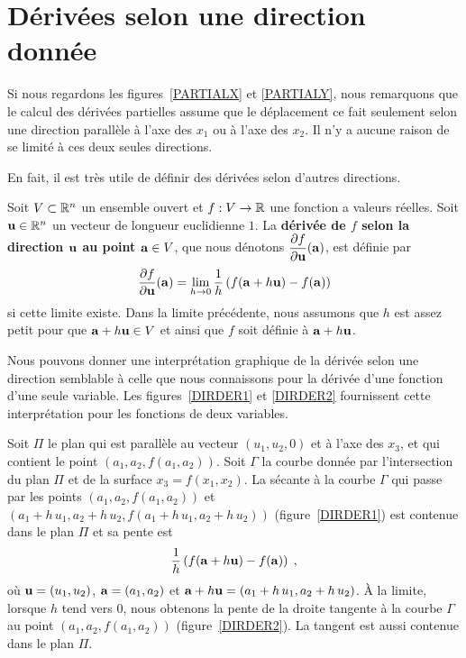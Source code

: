 {\section{Dérivées selon une direction donnée \eng}

Si nous regardons les figures~\ref{PARTIALX} et \ref{PARTIALY}, nous
remarquons que le calcul des dérivées partielles assume que le
déplacement ce fait seulement selon une direction parallèle à l'axe
des $x_1$ ou à l'axe des $x_2$.  Il n'y a aucune raison de se limité à ces
deux seules directions.

En fait, il est très utile de définir des dérivées selon d'autres
directions.

\begin{focus}{\dfn} 
Soit $V\subset \mathbb{R}^n$ un ensemble ouvert et $f:V\rightarrow \mathbb{R}$ une
fonction a valeurs réelles.  Soit 
$\mathbf{u} \in \mathbb{R}^n$ un vecteur de longueur euclidienne $1$.  La
{\bfseries dérivée de $f$ selon la direction $\mathbf{u}$ au point
$\mathbf{a} \in V$}, que nous dénotons
$\displaystyle \frac{\partial f}{\partial \mathbf{u}}(\mathbf{a})$, est définie par
\[
\frac{\partial f}{\partial \mathbf{u}}(\mathbf{a}) =
\lim_{h\rightarrow 0} \frac{1}{h}\left(f(\mathbf{a}+h\mathbf{u})-f(\mathbf{a})\right)
\]
si cette limite existe.  Dans la limite précédente, nous assumons que
$h$ est assez petit pour que $\mathbf{a}+h\mathbf{u} \in V$ et ainsi que $f$
soit définie à $\mathbf{a}+h\mathbf{u}$.
\end{focus}

Nous pouvons donner une interprétation graphique de la dérivée selon une
direction semblable à celle que nous connaissons pour la dérivée d'une
fonction d'une seule variable.  Les figures~\ref{DIRDER1} et
\ref{DIRDER2} fournissent cette interprétation pour les fonctions de
deux variables.

Soit $\Pi$ le plan qui est parallèle au vecteur $(u_1,u_2,0)$ et à
l'axe des $x_3$, et qui contient le point $(a_1,a_2,f(a_1,a_2))$.
Soit $\Gamma$ la courbe donnée par l'intersection du plan $\Pi$ et de
la surface $x_3 = f(x_1,x_2)$.  La sécante à la courbe $\Gamma$ qui
passe par les points $(a_1,a_2,f(a_1,a_2))$
et $(a_1+h\,u_1,a_2+h\,u_2,f(a_1+h\,u_1,a_2+h\,u_2))$ (figure~\ref{DIRDER1})
est contenue dans le plan $\Pi$ et sa pente est
\[
\frac{1}{h}\left(f(\mathbf{a}+h\mathbf{u})-f(\mathbf{a})\right) \; ,
\]
où $\mathbf{u}=(u_1,u_2)$, $\mathbf{a}=(a_1,a_2)$ et
$\mathbf{a}+h\mathbf{u} = (a_1+h\,u_1,a_2+h\,u_2)$.
À la limite, lorsque $h$ tend vers $0$, nous obtenons la pente de la
droite tangente à la courbe $\Gamma$ au point $(a_1,a_2,f(a_1,a_2))$
(figure~\ref{DIRDER2}).  La tangent est aussi contenue dans le plan $\Pi$.

}

